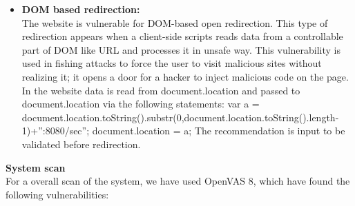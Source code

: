 \begin{itemize}
\item \textbf{DOM based redirection:}\\
The website is vulnerable for DOM-based open redirection. This type of redirection appears when a client-side scripts reads data from a controllable part of DOM like URL and processes it in unsafe way. This vulnerability is used in fishing attacks to force the user to visit malicious sites without realizing it; it opens a door for a hacker to inject malicious code on the page. In the website data is read from document.location and passed to document.location via the following statements: var a = document.location.toString().substr(0,document.location.toString().length-
1)+”:8080/sec”; document.location = a;
The recommendation is input to be validated before redirection.


\end{itemize}
\textbf{System scan}\\
For a overall scan of the system, we have used OpenVAS 8, which have found the following vulnerabilities:

